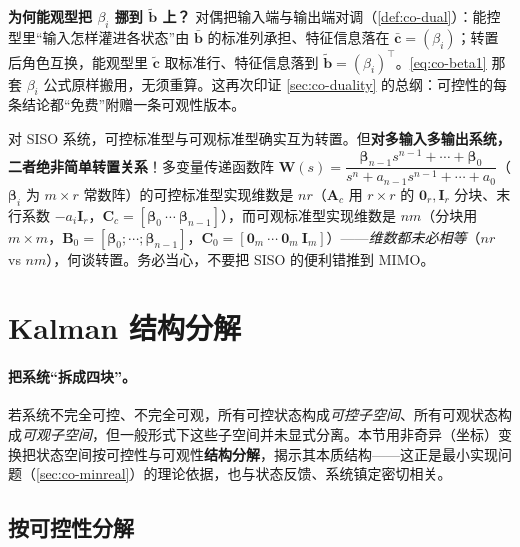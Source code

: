 \begin{note}
\textbf{为何能观型把 $\beta_i$ 挪到 $\tilde{\mathbf{b}}$ 上？}\;
对偶把输入端与输出端对调（\cref{def:co-dual}）：能控型里“输入怎样灌进各状态”由 $\bar{\mathbf{b}}$ 的标准列承担、特征信息落在 $\bar{\mathbf{c}}=(\beta_i)$；转置后角色互换，能观型里 $\tilde{\mathbf{c}}$ 取标准行、特征信息落到 $\tilde{\mathbf{b}}=(\beta_i)^\top$。\cref{eq:co-beta1} 那套 $\beta_i$ 公式原样搬用，无须重算\cite{liubao2006modern}。这再次印证 \cref{sec:co-duality} 的总纲：可控性的每条结论都“免费”附赠一条可观性版本。
\end{note}

\begin{pitfall}
对 SISO 系统，可控标准型与可观标准型确实互为转置。但\textbf{对多输入多输出系统，二者绝非简单转置关系}\cite{liubao2006modern}！多变量传递函数阵 $\mathbf{W}(s)=\dfrac{\boldsymbol{\beta}_{n-1}s^{n-1}+\cdots+\boldsymbol{\beta}_0}{s^n+a_{n-1}s^{n-1}+\cdots+a_0}$（$\boldsymbol{\beta}_i$ 为 $m\times r$ 常数阵）的可控标准型实现维数是 $nr$（$\mathbf{A}_c$ 用 $r\times r$ 的 $\mathbf{0}_r,\mathbf{I}_r$ 分块、末行系数 $-a_i\mathbf{I}_r$，$\mathbf{C}_c=[\boldsymbol{\beta}_0\ \cdots\ \boldsymbol{\beta}_{n-1}]$），而可观标准型实现维数是 $nm$（分块用 $m\times m$，$\mathbf{B}_0=[\boldsymbol{\beta}_0;\cdots;\boldsymbol{\beta}_{n-1}]$，$\mathbf{C}_0=[\mathbf{0}_m\ \cdots\ \mathbf{0}_m\ \mathbf{I}_m]$）——\emph{维数都未必相等}（$nr$ vs $nm$），何谈转置。务必当心，不要把 SISO 的便利错推到 MIMO。
\end{pitfall}

\section{Kalman 结构分解}
\label{sec:co-decomp}

\paragraph{把系统“拆成四块”。}
若系统不完全可控、不完全可观，所有可控状态构成\emph{可控子空间}、所有可观状态构成\emph{可观子空间}，但一般形式下这些子空间并未显式分离。本节用非奇异（坐标）变换把状态空间按可控性与可观性\textbf{结构分解}，揭示其本质结构——这正是最小实现问题（\cref{sec:co-minreal}）的理论依据，也与状态反馈、系统镇定密切相关\cite{liubao2006modern}。

\subsection{按可控性分解}
\label{sec:co-decomp-c}


